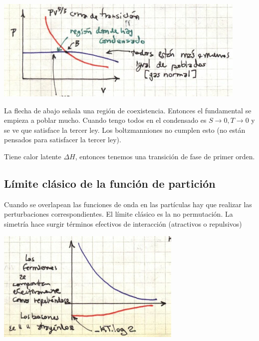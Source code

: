 \documentclass[10pt,oneside]{CBFT_book}
\begin{document}
\includegraphics[scale=0.5]{images/1606329555.jpg}

La flecha de abajo señala una región de coexistencia. Entonces el fundamental se empieza a poblar mucho.
Cuando tengo todos en el condensado es $ S \to 0, T \to 0$ y se ve que satisface la tercer ley.
Los boltzmanniones no cumplen esto (no están pensados para satisfacer la tercer ley).

Tiene calor latente $ \Delta H $, entonces tenemos una transición de fase de primer orden.

\subsection{Límite clásico de la función de partición}

Cuando se overlapean las funciones de onda en las partículas hay que realizar las perturbaciones 
correspondientes.
El límite clásico es la no permutación. La simetría hace surgir términos efectivos de interacción
(atractivos o repulsivos)

\includegraphics[scale=0.5]{images/1606329560.jpg}

\end{document}
